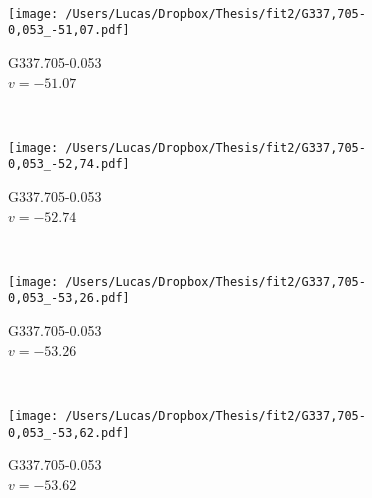 \begin{figure*}[t]
\begin{subfigure}[t]{0.3\textwidth}
	\end{subfigure}
	~
	\begin{subfigure}[t]{0.3\textwidth}
		\texttt{[image: /Users/Lucas/Dropbox/Thesis/fit2/G337,705-0,053\_-51,07.pdf]}
		\caption[]{G337.705-0.053\\$v=-51.07$\,\kms}
	\end{subfigure}
	~
	\begin{subfigure}[t]{0.3\textwidth}
		\texttt{[image: /Users/Lucas/Dropbox/Thesis/fit2/G337,705-0,053\_-52,74.pdf]}
		\caption[]{G337.705-0.053\\$v=-52.74$\,\kms}
	\end{subfigure}
	~
	\begin{subfigure}[t]{0.3\textwidth}
		\texttt{[image: /Users/Lucas/Dropbox/Thesis/fit2/G337,705-0,053\_-53,26.pdf]}
		\caption[]{G337.705-0.053\\$v=-53.26$\,\kms}
	\end{subfigure}
	~
	\begin{subfigure}[t]{0.3\textwidth}
		\texttt{[image: /Users/Lucas/Dropbox/Thesis/fit2/G337,705-0,053\_-53,62.pdf]}
		\caption[]{G337.705-0.053\\$v=-53.62$\,\kms}
	\end{subfigure}
	~
\end{figure*}
\clearpage
